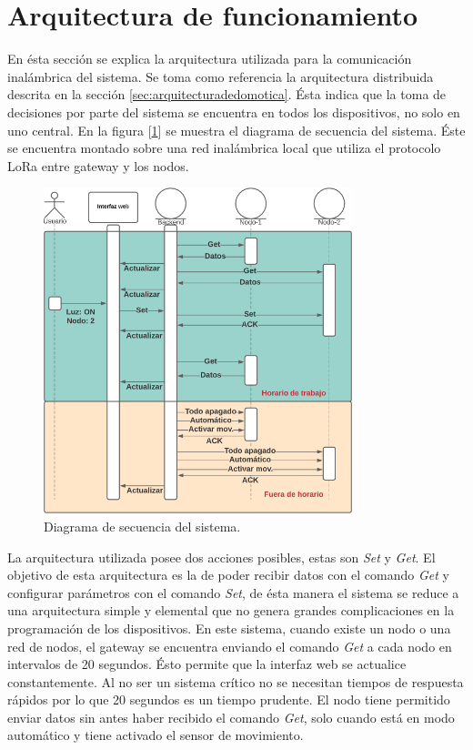 \section{Arquitectura de funcionamiento}

En ésta sección se explica la arquitectura utilizada para la comunicación inalámbrica del sistema.
Se toma como referencia la arquitectura distribuida descrita en la sección \ref{sec:arquitecturadedomotica}. Ésta indica que la toma de decisiones por parte del sistema se encuentra en todos los dispositivos, no solo en uno central.
En la figura [\ref{fig:diagramadesecuencia}] se muestra el diagrama de secuencia del sistema. Éste se encuentra montado sobre una red inalámbrica local que utiliza el protocolo LoRa entre gateway y los nodos.

\begin{figure}[ht!]
	\centering
	\includegraphics[width=0.8\textwidth]{./Figures/diagramadesecuencia.png}
	\caption{Diagrama de secuencia del sistema.}
	\label{fig:diagramadesecuencia}
\end{figure}

La arquitectura utilizada posee dos acciones posibles, estas son {\textit{Set}} y {\textit{Get}}. El objetivo de esta arquitectura es la de poder recibir datos con el comando {\textit{Get}} y configurar parámetros con el comando {\textit{Set}}, de ésta manera el sistema se reduce a una arquitectura simple y elemental que no genera grandes complicaciones en la programación de los dispositivos.
En este sistema, cuando existe un nodo o una red de nodos, el gateway se encuentra enviando el comando {\textit{Get}} a cada nodo en intervalos de 20 segundos. Ésto permite que la interfaz web se actualice constantemente. Al no ser un sistema crítico no se necesitan tiempos de respuesta rápidos por lo que 20 segundos es un tiempo prudente.
El nodo tiene permitido enviar datos sin antes haber recibido el comando {\textit{Get}}, solo cuando está en modo automático y tiene activado el sensor de movimiento.


